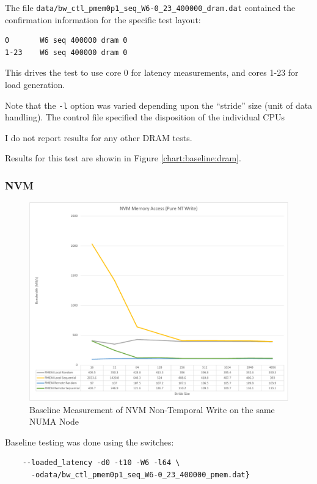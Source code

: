 The file \verb+data/bw_ctl_pmem0p1_seq_W6-0_23_400000_dram.dat+ contained the confirmation information
for the specific test layout:

\begin{verbatim}
0       W6 seq 400000 dram 0
1-23    W6 seq 400000 dram 0
\end{verbatim}

This drives the test to use core 0 for latency measurements, and cores 1-23 for load generation.

Note that the \verb+-l+ option was varied depending upon the ``stride'' size (unit of data handling).
The control file specified the disposition of the individual CPUs

I do not report results for any other DRAM tests.

Results for this test are showin in Figure \ref{chart:baseline:dram}.

\subsubsection{NVM}\label{baseline:nvm}

\begin{figure}[b]
\centering
    \caption{Baseline Measurement of NVM Non-Temporal Write on the same NUMA Node}\label{chart:baseline:nvm}
    \includegraphics[width=1\textwidth]{charts/nt-write-both-nodes-crop.pdf}
\end{figure}

Baseline testing was done using the switches:

\begin{verbatim}
    --loaded_latency -d0 -t10 -W6 -l64 \
      -odata/bw_ctl_pmem0p1_seq_W6-0_23_400000_pmem.dat}
\end{verbatim}

